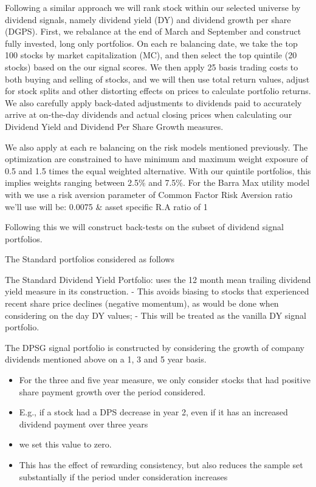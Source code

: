 \documentclass[11pt,preprint, authoryear]{elsarticle}
\numberwithin{equation}{section}
\numberwithin{figure}{section}
\numberwithin{table}{section}
\def\tightlist{} %
\begin{document}
Following a similar approach we will rank stock within our selected
universe by dividend signals, namely dividend yield (DY) and dividend
growth per share (DGPS). First, we rebalance at the end of March and
September and construct fully invested, long only portfolios. On each re
balancing date, we take the top 100 stocks by market capitalization
(MC), and then select the top quintile (20 stocks) based on the our
signal scores. We then apply 25 basis trading costs to both buying and
selling of stocks, and we will then use total return values, adjust for
stock splits and other distorting effects on prices to calculate
portfolio returns. We also carefully apply back-dated adjustments to
dividends paid to accurately arrive at on-the-day dividends and actual
closing prices when calculating our Dividend Yield and Dividend Per
Share Growth measures.

We also apply at each re balancing on the risk models mentioned
previously. The optimization are constrained to have minimum and maximum
weight exposure of 0.5 and 1.5 times the equal weighted alternative.
With our quintile portfolios, this implies weights ranging between 2.5\%
and 7.5\%. For the Barra Max utility model with we use a risk aversion
parameter of Common Factor Risk Aversion ratio we'll use will be: 0.0075
\& asset specific R.A ratio of 1

Following this we will construct back-tests on the subset of dividend
signal portfolios.

The Standard portfolios considered as follows

The Standard Dividend Yield Portfolio: uses the 12 month mean trailing
dividend yield measure in its construction. - This avoids biasing to
stocks that experienced recent share price declines (negative momentum),
as would be done when considering on the day DY values; - This will be
treated as the vanilla DY signal portfolio.

The DPSG signal portfolio is constructed by considering the growth of
company dividends mentioned above on a 1, 3 and 5 year basis.

\begin{itemize}
\tightlist
\item
  For the three and five year measure, we only consider stocks that had
  positive share payment growth over the period considered.
\item
  E.g., if a stock had a DPS decrease in year 2, even if it has an
  increased dividend payment over three years
\item
  we set this value to zero.
\item
  This has the effect of rewarding consistency, but also reduces the
  sample set substantially if the period under consideration increases
\end{itemize}
\end{document}
